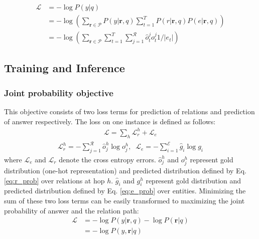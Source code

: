 \begin{equation}
\begin{aligned}
\mathcal{L} &= -\log P(y|q) \\
            &= -\log(\sum_{\mathbf{r}\in \mathcal{P}} P(y|\mathbf{r},q)\sum_{t=1}^T P(r|\mathbf{r},q)P(e|\mathbf{r},q))\\
            &= -\log(\sum_{\mathbf{r}\in \mathcal{P}} \sum_{t=1}^T\sum_{j=1}^{\mathcal{R}}\hat{o}^j_t{o^j_t} 1/|e_t|)
\end{aligned}
\label{obj:latent}
\end{equation}




\subsection{Training and Inference}





\subsubsection{Joint probability objective} This objective consists of two loss terms for prediction of relations and prediction of answer respectively. The loss on one instance is defined as follows:
\begin{align}
 \mathcal{L} = \sum_{h}\mathcal{L}_r^{h} + \mathcal{L}_e 
 \end{align}
  \vspace{-3ex}
\begin{align}
 \mathcal{L}_r^{h} = -\sum_{j=1}^{\mathcal{R}}\hat{o}^h_j\log{o^h_j},\;\;\mathcal{L}_e = -\sum_{i=1}^{\mathcal{E}}\hat{g}_i\log{g_i}
\end{align}
where $\mathcal{L}_e$ and $\mathcal{L}_r$ denote the cross entropy errors. $\hat{o}^h_j$ and $o^h_j$ represent gold distribution (one-hot representation) and predicted distribution defined by Eq. \ref{eq:r_prob} over relations at hop $h$. $\hat{g}_i$ and $g^h_i$ represent gold distribution and predicted distribution defined by Eq. \ref{eq:e_prob} over entities. Minimizing the sum of these two loss terms can be easily transformed to maximizing the joint probability of answer and the relation path:
\begin{equation}
\begin{aligned}
\mathcal{L} &= -\log P(y|\mathbf{r},q) - \log P(\mathbf{r}|q) \\
            &= -\log P(y,\mathbf{r}|q)
\end{aligned}
\end{equation}

